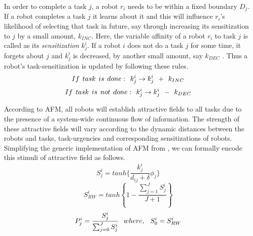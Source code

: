\documentclass{intech}
\begin{document}
In order to complete a task $j$, a robot $r_i$ needs to be within a fixed boundary $D_{j}$. If a robot completes a task $j$ it learns about it and this will influence $r_i$'s likelihood of selecting that task in future, say through increasing  its sensitization to $j$ by a small amount, $k_{INC}$. Here, the variable affinity of a robot $r_i$ to task $j$ is called as its {\em sensitization} $k^{i}_{j}$. If a robot $i$ does not do a task $j$ for some time, it forgets about $j$ and $k^i_j$ is decreased, by another small amount, say $k_{DEC}$ .
Thus a robot's task-sensitization is updated by following these rules.
\begin{equation}
 If\hspace*{0.15cm}task\hspace*{0.15cm}is\hspace*{0.15cm}done:\hspace*{0.15cm}  k^i_j \rightarrow   k^i_j \hspace*{0.15cm} + \hspace*{0.15cm} k_{INC}
\label{eqn:k-inc}
\end{equation}
\begin{equation}
 If\hspace*{0.15cm}task\hspace*{0.15cm}is\hspace*{0.15cm}not\hspace*{0.15cm}done:\hspace*{0.15cm}  k^i_j \rightarrow   k^i_j \hspace*{0.15cm} - \hspace*{0.15cm} k_{DEC}
\label{eqn:k-dec}
\end{equation}

According to AFM, all robots will establish attractive fields to all tasks due to the presence of a system-wide continuous flow of information. The strength of these attractive fields will vary according to the dynamic distances between the robots and tasks, task-urgencies and corresponding sensitizations of robots. Simplifying the generic implementation of AFM from \citet{Arcaute+2008}, we can formally encode this stimuli of attractive field as follows.
\begin{equation}
S_{j}^{i} = tanh\{\frac{k_{j}^{i}}{d_{ij}+\delta } \phi _{j}\}
\label{eqn:afm1}
\end{equation}
\begin{equation}
S^{i}_{RW} = tanh \left \{ 1 -  \frac{ \sum_{j=1}^{J} S^{i}_{j}}{J + 1} \right \}
\label{eqn:afm2}
\end{equation}
\begin{equation}
P_{j}^{i} = \frac{S_{j}^{i}}{\sum_{j=0}^{J} S_{j}^{i}} \hspace*{0.25cm}where,\hspace*{0.25cm}S^{i}_{0} = S^{i}_{RW}   
\label{eqn:afm3}
\end{equation}
\end{document}
